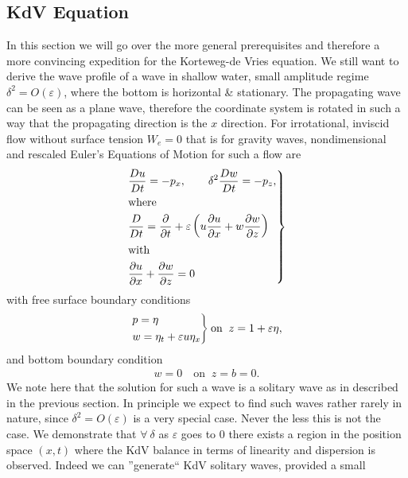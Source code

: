 \subsection{KdV Equation\label{sec:kdv}}
In this section we will go over the more general prerequisites and therefore
a more convincing expedition for the Korteweg-de Vries equation. We still
want to derive the wave profile of a wave in shallow water, small amplitude
regime $\delta^2 = O(\varepsilon)$, where the bottom is horizontal \&
stationary. The propagating wave can be seen as a plane wave, therefore the
coordinate system is rotated in such a way that the propagating direction is
the $x$ direction. For irrotational, inviscid flow without surface tension
$W_e=0$ that is for gravity waves, nondimensional and rescaled Euler's
Equations of Motion for such a flow are
\begin{align}
    \begin{drcases}
        \frac{Du}{Dt}=-p_x,\quad \quad \delta^2
        \frac{Dw}{Dt} = -p_z,\\
    \text{where}\\
    \frac{D}{Dt} = \frac{\partial }{\partial t}  + \varepsilon
    \left(
    u\frac{\partial u}{\partial x}
    +w\frac{\partial w}{\partial z}\right)
\\
    \text{with}\\
    \frac{\partial u}{\partial x} +\frac{\partial w}{\partial z}  = 0
    \end{drcases}
\end{align}
with free surface boundary conditions
\begin{align}
    \begin{drcases}
        p=\eta\\
        w=\eta_t+\varepsilon u \eta_x
    \end{drcases}
    \text{on}\;\; z= 1+\varepsilon\eta,
\end{align}
and bottom boundary condition
\begin{align}
    w = 0 \quad \text{on}\;\; z=b =0.
\end{align}
We note here that the solution for such a wave is a solitary wave as in
described in the previous section. In principle we expect to find such waves
rather rarely in nature, since $\delta^2 = O(\varepsilon)$ is a very special
case. Never the less this is not the case. We demonstrate that $\forall\
\delta$ as $\varepsilon$ goes to $0$ there exists a region in the position
space $(x, t)$ where the KdV balance in terms of linearity and dispersion
is observed. Indeed we can ''generate`` KdV solitary waves, provided a small
